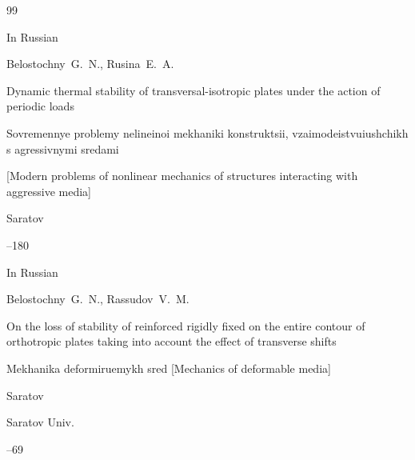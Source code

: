 \begin{thebibliography}{99}




















\lang In Russian

\by Belostochny~G.~N., Rusina~E.~A.

\paper  Dynamic thermal stability of transversal-isotropic plates under the action of periodic loads

\inbook Sovremennye problemy nelineinoi mekhaniki konstruktsii, vzaimodeistvuiushchikh s agressivnymi sredami

\rm [Modern problems of nonlinear mechanics of structures interacting with aggressive media]

\publaddr Saratov


--180






\lang In Russian

\by Belostochny~G.~N., Rassudov~V.~M.

\paper  On the loss of stability of reinforced rigidly fixed on the entire contour of orthotropic plates taking into account the effect of transverse shifts

\inbook Mekhanika deformiruemykh sred \rm [Mechanics of deformable media]

\publaddr Saratov

\publ Saratov Univ.


--69





















\end{thebibliography}





\renewcommand{\baselinestretch}{0.9}





%









